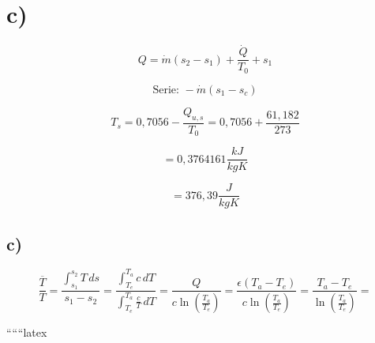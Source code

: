 

\section*{c)}

\[
Q = \dot{m} (s_2 - s_1) + \frac{\dot{Q}}{T_0} + s_1
\]

\[
\text{Serie: } - \dot{m} (s_1 - s_c)
\]

\[
T_s = 0,7056 - \frac{Q_{u,s}}{T_0} = 0,7056 + \frac{61,182}{273}
\]

\[
= 0,3764161 \frac{kJ}{kgK}
\]

\[
= 376,39 \frac{J}{kgK}
\]



\subsection*{c)}
\[
\frac{\overline{T}}{T} = \frac{\int_{s_1}^{s_2} T \, ds}{s_1 - s_2} = \frac{\int_{T_e}^{T_a} c \, dT}{\int_{T_e}^{T_a} \frac{c}{T} \, dT} = \frac{Q}{c \ln \left( \frac{T_a}{T_e} \right)} = \frac{\epsilon (T_a - T_e)}{c \ln \left( \frac{T_a}{T_e} \right)} = \frac{T_a - T_e}{\ln \left( \frac{T_a}{T_e} \right)} = 
\]

``````latex